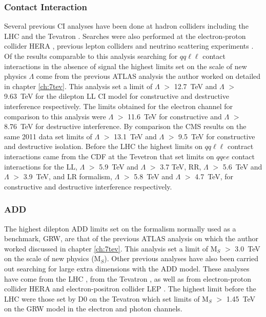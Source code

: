     \subsubsection*{Contact Interaction}
        Several previous CI analyses have been done at hadron colliders including the LHC \cite{PhysRevD.87.015010,ATLAS:2012pu,PhysRevD.87.032001,PhysRevD.87.052017} and the Tevatron \cite{PhysRevLett.103.191803,PhysRevLett.96.211801,PhysRevLett.87.231803,PhysRevLett.82.4769,PhysRevLett.79.2198}. Searches were also performed at the electron-proton collider HERA \cite{Chekanov200423,Adloff200335}, previous lepton colliders \cite{Abdallah2009.60.1,Schael2007.49.411,Abdallah2006.45.589,Abbiendi2004.33.173,Acciarri200081} and neutrino scattering experiments \cite{}. Of the results comparable to this analysis searching for $qq\ell\ell$ contact interactions in the absence of signal the highest limits set on the scale of new physics $\Lambda$ come from the previous ATLAS analysis the author worked on \cite{PhysRevD.87.015010} detailed in chapter \ref{ch:7tev}. This analysis set a limit of $\Lambda$ $>$ 12.7~TeV and $\Lambda$ $>$ 9.63~TeV for the dilepton LL CI model for constructive and destructive interference respectively. The limits obtained for the electron channel for comparison to this analysis were $\Lambda$ $>$ 11.6~TeV for constructive and $\Lambda$ $>$ 8.76~TeV for destructive interference. By comparison the CMS results on the same 2011 data \cite{PhysRevD.87.032001} set limits of $\Lambda$ $>$ 13.1~TeV and $\Lambda$ $>$ 9.5~TeV for constructive and destructive isolation. Before the LHC the highest limits on $qq\ell\ell$ contract interactions came from the CDF at the Tevetron \cite{PhysRevLett.96.211801} that set limits on $qqee$ contact interactions for the LL, $\Lambda$ $>$ 5.9~TeV and $\Lambda$ $>$ 3.7 TeV, RR, $\Lambda$ $>$ 5.6~TeV and $\Lambda$ $>$ 3.9~TeV, and LR formalism, $\Lambda$ $>$ 5.8~TeV and $\Lambda$ $>$ 4.7~TeV, for constructive and destructive interference respectively. 


    \subsubsection*{ADD}
        The highest dilepton ADD limits set on the formalism normally used as a benchmark, GRW, are that of the previous ATLAS analysis on which the author worked \cite{PhysRevD.87.015010} discussed in chapter \ref{ch:7tev}. This analysis set a limit of M$_{S}$ $>$ 3.0~TeV on the scale of new physics (M$_{S}$). Other previous analyses have also been carried out searching for large extra dimensions with the ADD model. These analyses have come from the LHC \cite{}, from the Tevatron \cite{Abazov:2008as}, as well as from electron-proton collider HERA \cite{} and electron-positron collider LEP \cite{}. The highest limit before the LHC were those set by D0 on the Tevatron \cite{Abazov:2008as} which set limits of M$_{S}$ $>$ 1.45~TeV on the GRW model in the electron and photon channels. 








